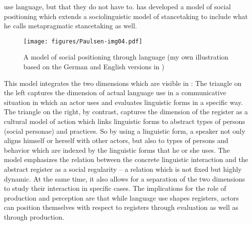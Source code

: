 use language, but that they do not have to. \citet{Spitzmuller2013} has developed a model of social positioning which extends a sociolinguistic model of stancetaking \citep{DuBois2007} to include what he calls metapragmatic stancetaking as well.


\begin{figure}
\texttt{[image: figures/Paulsen-img04.pdf]}
\caption{A model of social positioning through language (my own illustration based on the German and English versions in \citealt{Spitzmuller2013, Spitzmuller2015, Spitzmuller10062016})}
\label{fig:2:4}\label{fig:key:4}
\end{figure}


This model integrates the two dimensions which are visible in : The triangle on the left captures the dimension of actual language use in a communicative situation in which an actor uses and evaluates linguistic forms in a specific way. The triangle on the right, by contrast, captures the dimension of the register as a cultural model of action which links linguistic forms to abstract types of persons (social personae) and practices. So by using a linguistic form, a speaker not only aligns himself or herself with other actors, but also to types of persons and behavior which are indexed by the linguistic forms that he or she uses. The model emphasizes the relation between the concrete linguistic interaction and the abstract register as a social regularity – a relation which is not fixed but highly dynamic. At the same time, it also allows for a separation of the two dimensions to study their interaction in specific cases. The implications for the role of production and perception are that while language use shapes registers, actors can position themselves with respect to registers through evaluation as well as through production.



